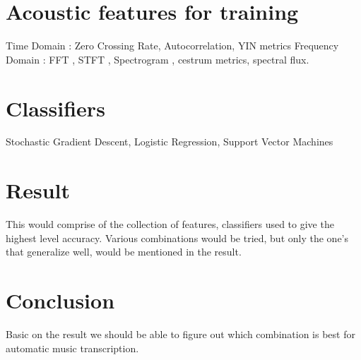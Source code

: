 \documentclass{article}
\begin{document}
\section{Acoustic features for training}\label{sec:features}
Time Domain : Zero Crossing Rate, Autocorrelation, YIN metrics Frequency Domain : FFT , STFT , Spectrogram , cestrum metrics, spectral flux.

\section{Classifiers}\label{sec:Classifiers}
Stochastic Gradient Descent, Logistic Regression, Support Vector Machines


\section{Result}\label{sec:Result}
This would comprise of the collection of features, classifiers used to give the highest level accuracy. Various combinations would be tried, but only the one's that generalize well, would be mentioned in the result. 

\section{Conclusion}\label{sec:Conclusion}
Basic on the result we should be able to figure out which combination is best for automatic music transcription.
\end{document}
